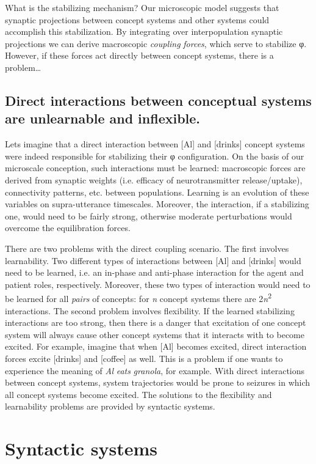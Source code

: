   What is the stabilizing mechanism? Our microscopic model suggests that synaptic projections between concept systems and other systems could accomplish this stabilization. By integrating over interpopulation synaptic projections we can derive macroscopic \textit{coupling} \textit{forces}, which serve to stabilize φ. However, if these forces act directly between concept systems, there is a problem…

\subsection{Direct interactions between conceptual systems are unlearnable and inflexible.} 

Lets imagine that a direct interaction between [Al] and [drinks] concept systems were indeed responsible for stabilizing their φ configuration. On the basis of our microscale conception, such interactions must be learned: macroscopic forces are derived from synaptic weights (i.e. efficacy of neurotransmitter release/uptake), connectivity patterns, etc. between populations. Learning is an evolution of these variables on supra-utterance timescales. Moreover, the interaction, if a stabilizing one, would need to be fairly strong, otherwise moderate perturbations would overcome the equilibration forces. 

  There are two problems with the direct coupling scenario. The first involves learnability. Two different types of interactions between [Al] and [drinks] would need to be learned, i.e. an in-phase and anti-phase interaction for the agent and patient roles, respectively. Moreover, these two types of interaction would need to be learned for all \textit{pairs} of concepts: for \textit{n} concept systems there are 2\textit{n}\textsuperscript{2} interactions. The second problem involves flexibility. If the learned stabilizing interactions are too strong, then there is a danger that excitation of one concept system will always cause other concept systems that it interacts with to become excited. For example, imagine that when [Al] becomes excited, direct interaction forces excite [drinks] and [coffee] as well. This is a problem if one wants to experience the meaning of \textit{Al} \textit{eats} \textit{granola}, for example. With direct interactions between concept systems, system trajectories would be prone to seizures in which all concept systems become excited. The solutions to the flexibility and learnability problems are provided by syntactic systems.

\section{Syntactic systems}

